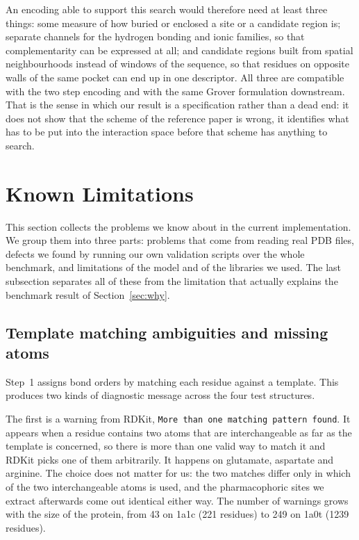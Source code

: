 An encoding able to support this search would therefore need at least three things: some
measure of how buried or enclosed a site or a candidate region is; separate channels for
the hydrogen bonding and ionic families, so that complementarity can be expressed at all;
and candidate regions built from spatial neighbourhoods instead of windows of the
sequence, so that residues on opposite walls of the same pocket can end up in one
descriptor. All three are compatible with the two step encoding and with the same Grover
formulation downstream. That is the sense in which our result is a specification rather
than a dead end: it does not show that the scheme of the reference paper is wrong, it
identifies what has to be put into the interaction space before that scheme has anything
to search.


\section{Known Limitations}
\label{sec:limitations}

This section collects the problems we know about in the current implementation. We group
them into three parts: problems that come from reading real PDB files, defects we found
by running our own validation scripts over the whole benchmark, and limitations of the
model and of the libraries we used. The last subsection separates all of these from the
limitation that actually explains the benchmark result of Section~\ref{sec:why}.

\subsection*{Template matching ambiguities and missing atoms}

Step~1 assigns bond orders by matching each residue against a template. This produces two
kinds of diagnostic message across the four test structures.

The first is a warning from RDKit, \texttt{More than one matching pattern found}. It
appears when a residue contains two atoms that are interchangeable as far as the template
is concerned, so there is more than one valid way to match it and RDKit picks one of them
arbitrarily. It happens on glutamate, aspartate and arginine. The choice does not matter
for us: the two matches differ only in which of the two interchangeable atoms is used,
and the pharmacophoric sites we extract afterwards come out identical either way. The
number of warnings grows with the size of the protein, from 43 on 1a1c (221 residues) to
249 on 1a0t (1239 residues).

